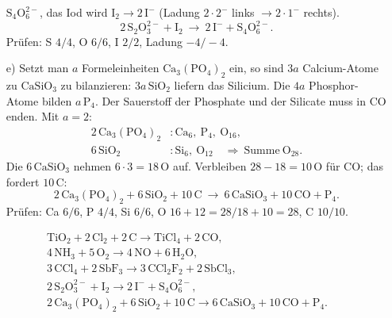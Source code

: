 \begin{itemize}
        $\mathrm{S_4O_6^{2-}}$, das Iod wird $\mathrm{I_2} \rightarrow
        2\,\mathrm{I^-}$ (Ladung $2\cdot 2^-$ links $\rightarrow 2\cdot 1^-$
        rechts).
        \[
          2\,\mathrm{S_2O_3^{2-}} + \mathrm{I_2}
          \ \rightarrow\ 2\,\mathrm{I^-} + \mathrm{S_4O_6^{2-}}.
        \]
        Prüfen: S $4/4$, O $6/6$, I $2/2$, Ladung $-4/-4$.
  \item[e)] Setzt man $a$ Formeleinheiten
        $\mathrm{Ca_3(PO_4)_2}$ ein, so sind $3a$ Calcium-Atome zu
        $\mathrm{CaSiO_3}$ zu bilanzieren: $3a\,\mathrm{SiO_2}$ liefern das
        Silicium. Die $4a$ Phosphor-Atome bilden $a\,\mathrm{P_4}$. Der
        Sauerstoff der Phosphate und der Silicate muss in $\mathrm{CO}$
        enden. Mit $a=2$:
        \begin{align*}
          2\,\mathrm{Ca_3(PO_4)_2} &: \mathrm{Ca}_6,\ \mathrm{P}_4,\ \mathrm{O}_{16},\\
          6\,\mathrm{SiO_2} &: \mathrm{Si}_6,\ \mathrm{O}_{12} \quad
          \Longrightarrow \ \mathrm{Summe}\ \mathrm{O}_{28}.
        \end{align*}
        Die $6\,\mathrm{CaSiO_3}$ nehmen $6\cdot 3 = 18\,\mathrm{O}$ auf.
        Verbleiben $28 - 18 = 10\,\mathrm{O}$
        für $\mathrm{CO}$; das fordert $10\,\mathrm{C}$:
        \[
          2\,\mathrm{Ca_3(PO_4)_2} + 6\,\mathrm{SiO_2} + 10\,\mathrm{C}
          \ \rightarrow\ 6\,\mathrm{CaSiO_3} + 10\,\mathrm{CO} + \mathrm{P_4}.
        \]
        Prüfen: Ca $6/6$, P $4/4$, Si $6/6$, O $16+12=28 / 18+10=28$,
        C $10/10$.
\end{itemize}

\begin{ergebnis}
\begin{gather*}
  \mathrm{TiO_2} + 2\,\mathrm{Cl_2} + 2\,\mathrm{C}
    \rightarrow \mathrm{TiCl_4} + 2\,\mathrm{CO}, \\
  4\,\mathrm{NH_3} + 5\,\mathrm{O_2}
    \rightarrow 4\,\mathrm{NO} + 6\,\mathrm{H_2O}, \\
  3\,\mathrm{CCl_4} + 2\,\mathrm{SbF_3}
    \rightarrow 3\,\mathrm{CCl_2F_2} + 2\,\mathrm{SbCl_3}, \\
  2\,\mathrm{S_2O_3^{2-}} + \mathrm{I_2}
    \rightarrow 2\,\mathrm{I^-} + \mathrm{S_4O_6^{2-}}, \\
  2\,\mathrm{Ca_3(PO_4)_2} + 6\,\mathrm{SiO_2} + 10\,\mathrm{C}
    \rightarrow 6\,\mathrm{CaSiO_3} + 10\,\mathrm{CO} + \mathrm{P_4}.
\end{gather*}
\end{ergebnis}

